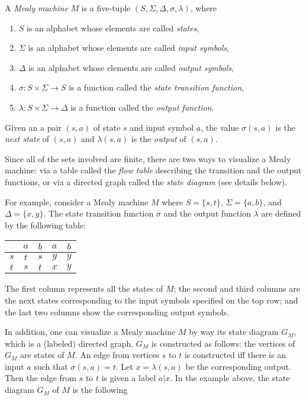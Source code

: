 \documentclass[12pt]{article}
\begin{document}
A \emph{Mealy machine} $M$ is a five-tuple $(S,\Sigma,\Delta,\sigma,\lambda)$, where
\begin{enumerate}
\item $S$ is an alphabet whose elements are called \emph{states},
\item $\Sigma$ is an alphabet whose elements are called \emph{input symbols},
\item $\Delta$ is an alphabet whose elements are called \emph{output symbols},
\item $\sigma: S\times \Sigma \to S$ is a function called the \emph{state transition function},
\item $\lambda: S\times \Sigma \to \Delta$ is a function called the \emph{output function}.
\end{enumerate}
Given an a pair $(s,a)$ of state $s$ and input symbol $a$, the value $\sigma(s,a)$ is the \emph{next state} of $(s,a)$ and $\lambda(s,a)$ is the \emph{output} of $(s,a)$.

Since all of the sets involved are finite, there are two ways to visualize a Mealy machine: via a table called the \emph{flow table} describing the transition and the output functions, or via a directed graph called the \emph{state diagram} (see details below).

For example, consider a Mealy machine $M$ where $S=\lbrace s,t\rbrace$, $\Sigma = \lbrace a,b\rbrace$, and $\Delta = \lbrace x,y\rbrace$.  The state transition function $\sigma$ and the output function $\lambda$ are defined by the following table:

\begin{center}
\begin{tabular}{|c||c|c||c|c|}
\hline
& $a$ & $b$ & $a$ & $b$ \\
\hline\hline
$s$ & $t$ & $s$ & $y$ & $y$ \\
\hline
$t$ & $s$ & $t$ & $x$ & $y$ \\
\hline
\end{tabular}
\end{center}
The first column represents all the states of $M$; the second and third columns are the next states corresponding to the input symbols specified on the top row; and the last two columns show the corresponding output symbols.

In addition, one can visualize a Mealy machine $M$ by way its state diagram $G_M$, which is a (labeled) directed graph.  $G_M$ is constructed as follows: the vertices of $G_M$ are states of $M$.  An edge from vertices $s$ to $t$ is constructed iff there is an input $a$ such that $\sigma(s,a)=t$.  Let $x=\lambda(s,a)$ be the corresponding output.  Then the edge from $s$ to $t$ is given a label $a|x$.  In the example above, the state diagram $G_M$ of $M$ is the following
\end{document}
